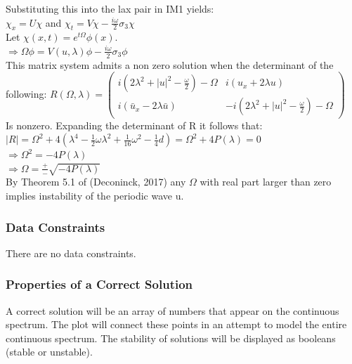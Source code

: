 \documentclass[12pt]{article}
\begin{document}
Substituting this into the lax pair in IM1 yields: \\ 

$\chi _{x} = U \chi $ and $\chi_{t} = V \chi - \frac{i \omega}{2} \sigma_{3} 
\chi$ \\ 
Let $\chi (x,t) = e^{t \Omega} \phi (x) $. \\ 
$\Rightarrow \Omega \phi = V(u,\lambda) \phi - \frac{i \omega}{2} \sigma_{3} 
\phi$ \\ 

This matrix system admits a non zero solution when the determinant of the 
following: 
$ R(\Omega, \lambda) = \begin{pmatrix} 
i(2\lambda^{2} + |u|^{2} - \frac{\omega}{2}) - \Omega & i(u_{x}+2\lambda u) \\
i(\bar{u}_{x}-2\lambda \bar{u}) & -i(2\lambda^{2} + |u|^{2} - \frac{\omega}{2}) 
- \Omega
\end{pmatrix} $ \\ 
Is nonzero. Expanding the determinant of R it follows that: \\
$|R| = \Omega^{2} + 4(\lambda^{4} - \frac{1}{2} \omega \lambda^{2} + 
\frac{1}{16} \omega^{2} - \frac{1}{4}d ) = \Omega^{2} +4P(\lambda) = 0$ \\ 
$ \Rightarrow \Omega^{2} = -4P(\lambda)$ \\ 
$ \Rightarrow \Omega = \frac{+}{-}\sqrt{-4P(\lambda)} $\\ 
By Theorem 5.1 of (Deconinck, 2017) any $\Omega$ with real part larger than 
zero implies instability of the periodic wave u. \\
 

\subsubsection{Data Constraints} \label{sec_DataConstraints}    

There are no data constraints. 

\subsubsection{Properties of a Correct Solution} \label{sec_CorrectSolution}

\noindent
A correct solution will be an array of numbers that appear on the continuous 
spectrum. The plot will connect these points in an attempt to model the entire 
continuous spectrum. The stability of solutions will be displayed as booleans 
(stable or unstable). 
\end{document}

